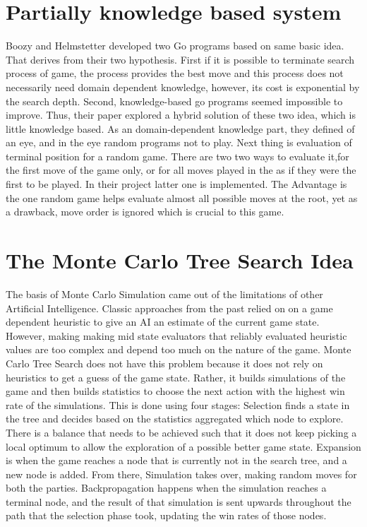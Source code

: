 \documentclass[11pt]{article}
\begin{document}
\section{Partially knowledge based system}
Boozy and Helmstetter developed two Go programs based on same basic idea\cite{bouzy2004monte}. That derives from their two hypothesis. First if it is possible to terminate search process of game, the process provides the best move and this process does not necessarily need domain dependent knowledge, however, its cost is exponential by the search depth. Second, knowledge-based go programs seemed impossible to improve. Thus, their paper explored a hybrid solution of these two idea, which is little knowledge based. As an domain-dependent knowledge part, they defined of an {eye}, and in the {eye} random programs not to play. Next thing is evaluation of terminal position for a random game. There are two two ways to evaluate it,{for the first move of the game only}, or  {for all moves played in the as if they were the first to be played.} In their project latter one is implemented. The Advantage is the one random game helps evaluate almost all possible moves at the root, yet as a drawback, move order is ignored which is crucial to this game. 

\section{The Monte Carlo Tree Search Idea}

The basis of Monte Carlo Simulation came out of the limitations of other Artificial Intelligence. Classic approaches from the past relied on on a game dependent heuristic to give an AI an estimate of the current game state. However, making making mid state evaluators that reliably evaluated heuristic values are too complex and depend too much on the nature of the game. \cite{chaslot2008monte} Monte Carlo Tree Search does not have this problem because it does not rely on heuristics to get a guess of the game state. Rather, it builds simulations of the game and then builds statistics to choose the next action with the highest win rate of the simulations. This is done using four stages: Selection finds a state in the tree and decides based on the statistics aggregated which node to explore. There is a balance that needs to be achieved such that it does not keep picking a local optimum to allow the exploration of a possible better game state. Expansion is when the game reaches a node that is currently not in the search tree, and a new node is added. From there, Simulation takes over, making random moves for both the parties. Backpropagation happens when the simulation reaches a terminal node, and the result of that simulation is sent upwards throughout the path that the selection phase took, updating the win rates of those nodes. 
\end{document}

